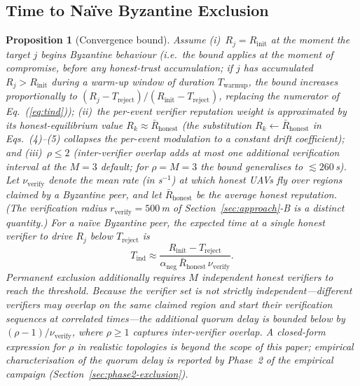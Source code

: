 \documentclass[journal,10pt,twocolumn]{IEEEtran}
\newtheorem{proposition}{Proposition}
\begin{document}
\subsection{Time to Na\"ive Byzantine Exclusion}
\label{sec:time-byz-exclusion}

\begin{proposition}[Convergence bound]
\label{prop:conv}
Assume (i)~$R_j = R_\text{init}$ at the moment the target $j$ begins Byzantine behaviour (i.e.\ the bound applies at the moment of compromise, before any honest-trust accumulation; if $j$ has accumulated $R_j > R_\text{init}$ during a warm-up window of duration $T_\text{warmup}$, the bound increases proportionally to $(R_j - T_\text{reject})/(R_\text{init} - T_\text{reject})$, replacing the numerator of Eq.~(\ref{eq:tind})); (ii)~the per-event verifier reputation weight is approximated by its honest-equilibrium value $R_k \approx \bar{R}_\text{honest}$ (the substitution $R_k \leftarrow \bar{R}_\text{honest}$ in Eqs.~(4)--(5) collapses the per-event modulation to a constant drift coefficient); and (iii)~$\rho \leq 2$ (inter-verifier overlap adds at most one additional verification interval at the $M=3$ default; for $\rho = M = 3$ the bound generalises to $\lesssim 260$\,s). Let $\nu_\text{verify}$ denote the mean rate (in s$^{-1}$) at which honest UAVs fly over regions claimed by a Byzantine peer, and let $\bar{R}_\text{honest}$ be the average honest reputation. (The verification \emph{radius} $r_\text{verify}=500$\,m of Section~\ref{sec:approach}-B is a distinct quantity.) For a na\"ive Byzantine peer, the expected time at a single honest verifier to drive $R_j$ below $T_\text{reject}$ is
\begin{equation}
T_\text{ind} \approx \frac{R_\text{init} - T_\text{reject}}{\alpha_\text{neg}\, \bar{R}_\text{honest}\, \nu_\text{verify}}.
\label{eq:tind}
\end{equation}
Permanent exclusion additionally requires $M$ independent honest verifiers to reach the threshold. Because the verifier set is not strictly independent---different verifiers may overlap on the same claimed region and start their verification sequences at correlated times---the additional quorum delay is bounded below by $(\rho-1)/\nu_\text{verify}$, where $\rho\geq 1$ captures inter-verifier overlap. A closed-form expression for $\rho$ in realistic topologies is beyond the scope of this paper; empirical characterisation of the quorum delay is reported by Phase~2 of the empirical campaign (Section~\ref{sec:phase2-exclusion}).
\end{proposition}
\end{document}
